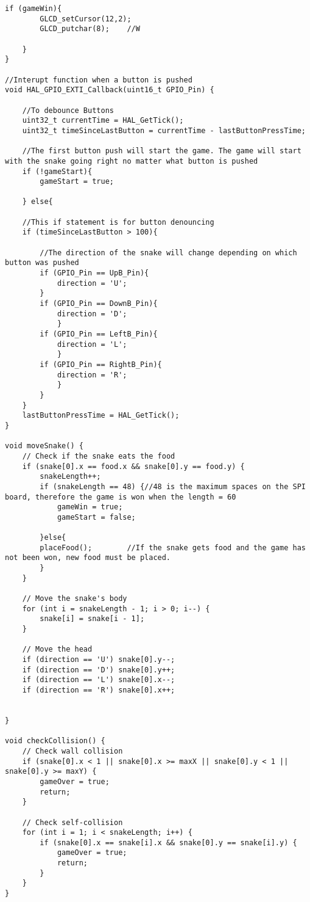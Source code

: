 \begin{lstlisting}[style=CStyle]
    if (gameWin){
    	GLCD_setCursor(12,2);
    	GLCD_putchar(8);	//W

    }
}

//Interupt function when a button is pushed
void HAL_GPIO_EXTI_Callback(uint16_t GPIO_Pin) {
	
	//To debounce Buttons
	uint32_t currentTime = HAL_GetTick();
	uint32_t timeSinceLastButton = currentTime - lastButtonPressTime;
		
	//The first button push will start the game. The game will start with the snake going right no matter what button is pushed
	if (!gameStart){
		gameStart = true;

	} else{
		
	//This if statement is for button denouncing
	if (timeSinceLastButton > 100){
		
		//The direction of the snake will change depending on which button was pushed
		if (GPIO_Pin == UpB_Pin){
			direction = 'U';
		}
		if (GPIO_Pin == DownB_Pin){
			direction = 'D';
			}
		if (GPIO_Pin == LeftB_Pin){
			direction = 'L';
			}
		if (GPIO_Pin == RightB_Pin){
			direction = 'R';
			}
		}
	}
	lastButtonPressTime = HAL_GetTick();
}

void moveSnake() {
    // Check if the snake eats the food
    if (snake[0].x == food.x && snake[0].y == food.y) {
        snakeLength++;
        if (snakeLength == 48) {//48 is the maximum spaces on the SPI board, therefore the game is won when the length = 60
        	gameWin = true;
        	gameStart = false;

        }else{
        placeFood();		//If the snake gets food and the game has not been won, new food must be placed.
        }
    }

	// Move the snake's body
    for (int i = snakeLength - 1; i > 0; i--) {
        snake[i] = snake[i - 1];
    }

    // Move the head
    if (direction == 'U') snake[0].y--;
    if (direction == 'D') snake[0].y++;
    if (direction == 'L') snake[0].x--;
    if (direction == 'R') snake[0].x++;


}

void checkCollision() {
    // Check wall collision
    if (snake[0].x < 1 || snake[0].x >= maxX || snake[0].y < 1 || snake[0].y >= maxY) {
        gameOver = true;
        return;
    }

    // Check self-collision
    for (int i = 1; i < snakeLength; i++) {
        if (snake[0].x == snake[i].x && snake[0].y == snake[i].y) {
            gameOver = true;
            return;
        }
    }
}


\end{lstlisting}
